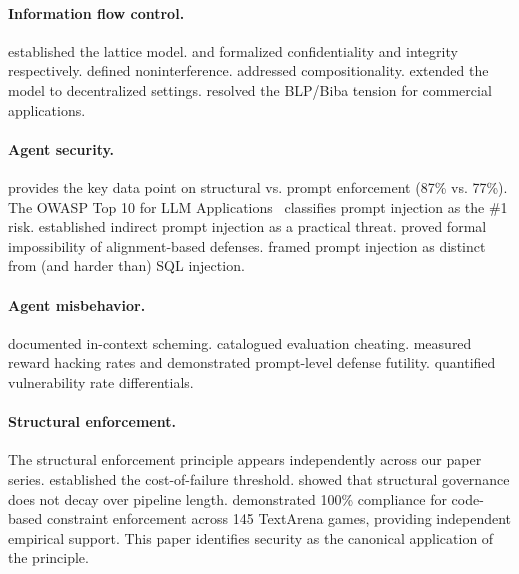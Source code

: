 \documentclass[11pt, a4paper, copyright]{googledeepmind}
\begin{document}
\paragraph{Information flow control.}
\citet{denning1976lattice} established the lattice model. \citet{bell1973secure} and \citet{biba1977integrity} formalized confidentiality and integrity respectively. \citet{goguen1982security} defined noninterference. \citet{rushby1992noninterference} addressed compositionality. \citet{myers1997decentralized} extended the model to decentralized settings. \citet{lipner1982nondiscretionary} resolved the BLP/Biba tension for commercial applications.

\paragraph{Agent security.}
\citet{wang2026agentspec} provides the key data point on structural vs. prompt enforcement (87\% vs. 77\%). The OWASP Top 10 for LLM Applications~\citep{owasp2025llm} classifies prompt injection as the \#1 risk. \citet{greshake2023prompt} established indirect prompt injection as a practical threat. \citet{wolf2024fundamental} proved formal impossibility of alignment-based defenses. \citet{ncsc2023prompt} framed prompt injection as distinct from (and harder than) SQL injection.

\paragraph{Agent misbehavior.}
\citet{apollo2025scheming} documented in-context scheming. \citet{nist2025cheating} catalogued evaluation cheating. \citet{metr2025rewardhacking} measured reward hacking rates and demonstrated prompt-level defense futility. \citet{coderabbit2025state} quantified vulnerability rate differentials.

\paragraph{Structural enforcement.}
The structural enforcement principle appears independently across our paper series. \citet{pillar-reliability} established the cost-of-failure threshold. \citet{pillar-governance} showed that structural governance does not decay over pipeline length. \citet{google2026autoharness} demonstrated 100\% compliance for code-based constraint enforcement across 145 TextArena games, providing independent empirical support. This paper identifies security as the canonical application of the principle.
\end{document}
